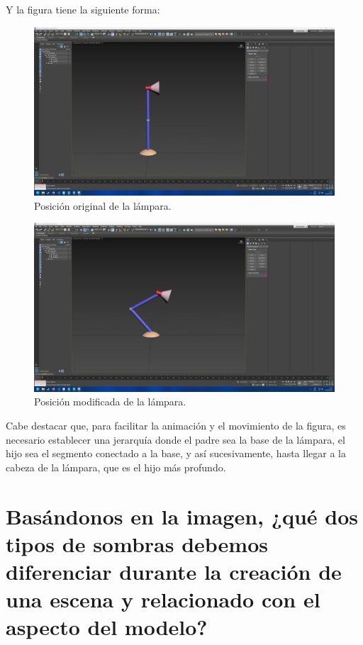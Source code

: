 \documentclass{article}
\begin{document}
Y la figura tiene la siguiente forma:


\begin{figure}[H]
    \centering
    \includegraphics[width=\textwidth]{imagenes/lamp1.png}
    \caption{Posición original de la lámpara.}
 \end{figure}    

 \begin{figure}[H]
    \centering
    \includegraphics[width=\textwidth]{imagenes/lamp2.png}
    \caption{Posición modificada de la lámpara.}
 \end{figure}    

Cabe destacar que, para facilitar la animación y el movimiento de la figura, es necesario establecer una jerarquía donde el padre sea la base de la lámpara, el hijo sea el segmento conectado a la base, y así sucesivamente, hasta llegar a la cabeza de la lámpara, que es el hijo más profundo.

\section{Basándonos en la imagen, ¿qué dos tipos de sombras debemos diferenciar durante la creación de una escena y relacionado con el aspecto del modelo?}
\end{document}
